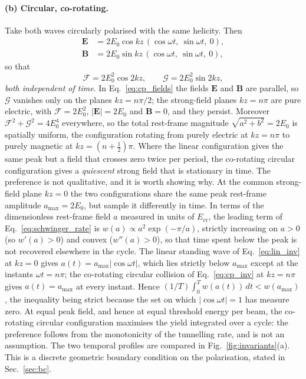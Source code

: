 \documentclass[aps,prd,reprint,superscriptaddress,nofootinbib,floatfix]{revtex4-2}
\begin{document}
\paragraph{(b) Circular, co-rotating.} Take both waves circularly polarised
with the same helicity. Then
\begin{equation}
\begin{aligned}
\mathbf{E}&=2E_0\cos kz\,(\cos\omega t,\ \sin\omega t,\ 0),\\
\mathbf{B}&=2E_0\sin kz\,(\cos\omega t,\ \sin\omega t,\ 0),
\end{aligned}
\label{eq:cp_fields}
\end{equation}
so that
\begin{equation}
\mathcal{F}=2E_0^2\cos 2kz,
\qquad
\mathcal{G}=2E_0^2\sin 2kz ,
\label{eq:cp_inv}
\end{equation}
\emph{both independent of time}. In Eq.~\eqref{eq:cp_fields} the fields
$\mathbf{E}$ and $\mathbf{B}$ are
parallel, so $\mathcal{G}$ vanishes only on the planes $kz=n\pi/2$; the
strong-field planes $kz=n\pi$ are pure electric, with $\mathcal{F}=2E_0^2$,
$|\mathbf{E}|=2E_0$ and $\mathbf{B}=0$, and they persist. Moreover
$\mathcal{F}^2+\mathcal{G}^2=4E_0^4$ everywhere, so the total rest-frame
magnitude $\sqrt{a^2+b^2}=2E_0$ is spatially uniform, the configuration
rotating from purely electric at $kz=n\pi$ to purely magnetic at
$kz=(n+\tfrac12)\pi$. Where the linear configuration gives the same peak but a
field that crosses zero twice per period, the co-rotating circular
configuration gives a \emph{quiescent} strong field that is stationary in
time. The preference is not qualitative, and it is worth showing why. At the
common strong-field plane $kz=0$ the two configurations share the same peak
rest-frame amplitude $a_{\max}=2E_0$, but sample it differently in time. In
terms of the dimensionless rest-frame field $a$ measured in units of
$E_{\mathrm{cr}}$, the leading term of Eq.~\eqref{eq:schwinger_rate} is
$w(a)\propto a^{2}\exp(-\pi/a)$, strictly increasing on $a>0$ (so
$w'(a)>0$) and convex ($w''(a)>0$), so that time spent below the peak is not
recovered elsewhere in the cycle. The linear standing wave of
Eq.~\eqref{eq:lin_inv} at $kz=0$ gives $a(t)=a_{\max}|\cos\omega t|$,
which lies strictly below $a_{\max}$ except at the instants
$\omega t=n\pi$; the co-rotating circular collision of
Eq.~\eqref{eq:cp_inv} at $kz=n\pi$ gives $a(t)=a_{\max}$ at every
instant. Hence $(1/T)\int_0^{T}w(a(t))\,dt<w(a_{\max})$, the inequality
being strict because the set on which $|\cos\omega t|=1$ has measure zero.
At equal peak field, and hence at equal threshold energy per beam, the
co-rotating circular configuration maximises the yield integrated over a
cycle: the preference follows from the monotonicity of the tunnelling rate,
and is not an assumption. The two temporal profiles are compared in
Fig.~\ref{fig:invariants}(a). This is a discrete geometric boundary condition
on the polarisation, stated in Sec.~\ref{sec:bc}.
\end{document}
